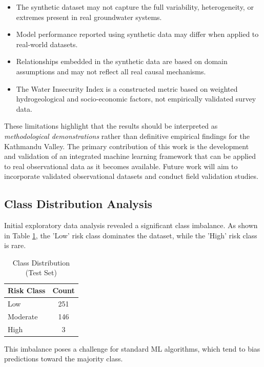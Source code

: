 \documentclass[conference]{IEEEtran}
\begin{document}
\begin{itemize}
    \item The synthetic dataset may not capture the full variability, heterogeneity, or extremes present in real groundwater systems.
    \item Model performance reported using synthetic data may differ when applied to real-world datasets.
    \item Relationships embedded in the synthetic data are based on domain assumptions and may not reflect all real causal mechanisms.
    \item The Water Insecurity Index is a constructed metric based on weighted hydrogeological and socio-economic factors, not empirically validated survey data.
\end{itemize}

These limitations highlight that the results should be interpreted as \textit{methodological demonstrations} rather than definitive empirical findings for the Kathmandu Valley. The primary contribution of this work is the development and validation of an integrated machine learning framework that can be applied to real observational data as it becomes available. Future work will aim to incorporate validated observational datasets and conduct field validation studies.

\subsection{Class Distribution Analysis}
Initial exploratory data analysis revealed a significant class imbalance. As shown in Table \ref{tab:distribution}, the 'Low' risk class dominates the dataset, while the 'High' risk class is rare.

\begin{table}[H]
\caption{Class Distribution (Test Set)}
\begin{center}
\begin{tabular}{lc}
\toprule
\textbf{Risk Class} & \textbf{Count} \\
\midrule
Low & 251 \\
Moderate & 146 \\
High & 3 \\
\bottomrule
\end{tabular}
\label{tab:distribution}
\end{center}
\end{table}

This imbalance poses a challenge for standard ML algorithms, which tend to bias predictions toward the majority class.
\end{document}
